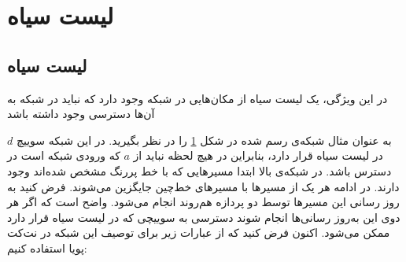 \section{لیست سیاه}

\subsection{لیست‌ سیاه}
در این ویژگی، یک لیست‌ سیاه
از مکان‌هایی در شبکه وجود دارد که نباید در شبکه به آن‌ها دسترسی وجود داشته باشد
\cite{network-abstractions}
\begin{figure}
    \centering
    \caption{ }
    \label{fig:blacklist}
\end{figure}
به عنوان مثال شبکه‌ی رسم شده در شکل
\ref{fig:blacklist}
را در نظر بگیرید.
در این شبکه سوییچ
$d$
در لیست‌ سیاه قرار دارد، بنابراین در هیچ لحظه نباید از
$a$
که ورودی شبکه است در دسترس باشد.
در شبکه‌ی بالا ابتدا مسیر‌هایی که با خط پررنگ مشخص شده‌اند وجود دارند.
در ادامه هر یک از مسیرها با مسیر‌های خط‌چین جایگزین می‌شوند.
فرض کنید به روز رسانی این مسیر‌ها توسط دو پردازه هم‌روند انجام می‌شود.
واضح است که اگر هر دوی این به‌روز رسانی‌ها انجام شوند دسترسی به سوییچی که در لیست سیاه قرار دارد ممکن می‌شود.
اکنون فرض کنید که از عبارات زیر برای توصیف این شبکه در نت‌کت پویا استفاده کنیم:
